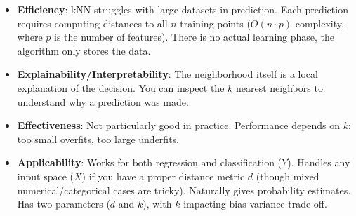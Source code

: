 \begin{itemize}
    \item \textbf{Efficiency}: kNN struggles with large datasets in prediction. Each prediction requires computing distances to all $n$ training points ($O(n \cdot p)$ complexity, where $p$ is the number of features). There is no actual learning phase, the algorithm only stores the data.
    
    \item \textbf{Explainability/Interpretability}: The neighborhood itself is a local explanation of the decision. You can inspect the $k$ nearest neighbors to understand why a prediction was made.
    
    \item \textbf{Effectiveness}: Not particularly good in practice. Performance depends on $k$: too small overfits, too large underfits.
    
    \item \textbf{Applicability}: Works for both regression and classification ($Y$). Handles any input space ($X$) if you have a proper distance metric $d$ (though mixed numerical/categorical cases are tricky). Naturally gives probability estimates. Has two parameters ($d$ and $k$), with $k$ impacting bias-variance trade-off.
\end{itemize}


